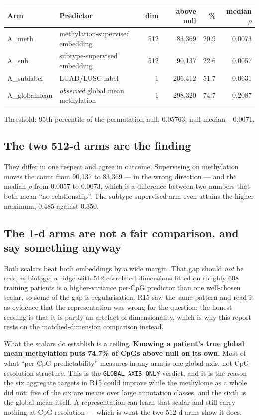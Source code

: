 \documentclass[11pt,a4paper]{article}
\begin{document}
\begin{center}
\begin{tabular}{@{}llrrrr@{}}
\toprule
\textbf{Arm} & \textbf{Predictor} & \textbf{dim} & \textbf{above null} & \textbf{\%} &
\textbf{median $\rho$} \\
\midrule
A\_meth & methylation-supervised embedding & 512 & 83{,}369 & 20.9 & 0.0073 \\
A\_sub & subtype-supervised embedding & 512 & 90{,}137 & 22.6 & 0.0057 \\
\midrule
A\_sublabel & LUAD/LUSC label & 1 & 206{,}412 & 51.7 & 0.0631 \\
A\_globalmean & \emph{observed} global mean methylation & 1 & 298{,}320 & 74.7 & 0.2087 \\
\bottomrule
\end{tabular}
\end{center}

\noindent Threshold: 95th percentile of the permutation null, 0.05763; null median $-0.0071$.

\subsection{The two 512-d arms are the finding}

They differ in one respect and agree in outcome. Supervising on methylation moves the count from
90{,}137 to 83{,}369 --- in the wrong direction --- and the median $\rho$ from 0.0057 to 0.0073,
which is a difference between two numbers that both mean ``no relationship''. The
subtype-supervised arm even attains the higher maximum, 0.485 against 0.350.

\subsection{The 1-d arms are not a fair comparison, and say something anyway}

Both scalars beat both embeddings by a wide margin. That gap should \emph{not} be read as
biology: a ridge with 512 correlated dimensions fitted on roughly 608 training patients is a
higher-variance per-CpG predictor than one well-chosen scalar, so some of the gap is
regularisation. R15 saw the same pattern and read it as evidence that the representation was
wrong for the question; the honest reading is that it is partly an artefact of dimensionality,
which is why this report rests on the matched-dimension comparison instead.

What the scalars do establish is a ceiling. \textbf{Knowing a patient's true global mean
methylation puts 74.7\% of CpGs above null on its own.} Most of what ``per-CpG predictability''
measures in any arm is one global axis, not CpG-resolution structure. This is the
\texttt{GLOBAL\_AXIS\_ONLY} verdict, and it is the reason the six aggregate targets in R15 could
improve while the methylome as a whole did not: five of the six are means over large annotation
classes, and the sixth is the global mean itself. A representation can learn that scalar and
still carry nothing at CpG resolution --- which is what the two 512-d arms show it does.
\end{document}
